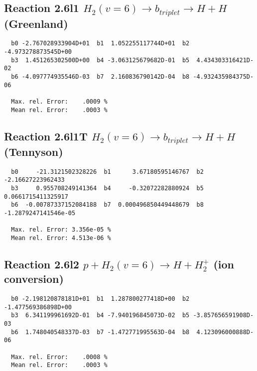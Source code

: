 \documentclass[12pt]{article}
\begin{document}
\newpage
\subsection{
Reaction 2.6l1
$ H_2(v=6) \rightarrow b_{triplet}\rightarrow H + H $ (Greenland) 
}


\begin{small}\begin{verbatim}
  b0 -2.767028933904D+01  b1  1.052255117744D+01  b2 -4.973278873545D+00
  b3  1.451265302500D+00  b4 -3.063125679682D-01  b5  4.434303316421D-02
  b6 -4.097774935546D-03  b7  2.160836790142D-04  b8 -4.932435984375D-06

  Max. rel. Error:    .0009 %
  Mean rel. Error:    .0003 %

\end{verbatim}\end{small}


\subsection{
Reaction 2.6l1T
$  H_2(v=6) \rightarrow b_{triplet}\rightarrow H + H $ (Tennyson)
}


\begin{small}\begin{verbatim}
  b0     -21.3121502328226  b1      3.67180595146767  b2     -2.16627223962433
  b3     0.955708249141364  b4     -0.32072282880924  b5    0.0661715411325917
  b6  -0.00787337152084188  b7  0.000496850449448679  b8  -1.2879247141546e-05

  Max. rel. Error: 3.356e-05 %
  Mean rel. Error: 4.513e-06 %
\end{verbatim}\end{small}


\subsection{
Reaction 2.6l2
$ p + H_2(v=6) \rightarrow H + H_2^+$ (ion conversion)
}


\begin{small}\begin{verbatim}
  b0 -2.198120878181D+01  b1  1.287800277418D+00  b2 -1.477569386898D+00
  b3  6.341199961692D-01  b4 -7.940196845073D-02  b5 -3.857656591908D-03
  b6  1.748040548337D-03  b7 -1.472771995563D-04  b8  4.123096000888D-06

  Max. rel. Error:    .0008 %
  Mean rel. Error:    .0003 %


\end{verbatim}\end{small}
\end{document}
